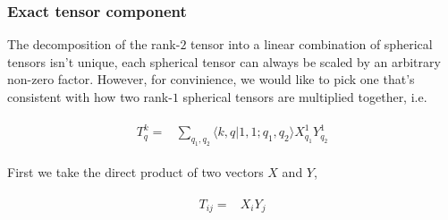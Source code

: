 \documentclass[10pt,fleqn]{article}
\newcommand{\eqar}[1]
{
  \begin{align}
    #1
  \end{align}
}
\begin{document}
\subsubsection{Exact tensor component}
The decomposition of the rank-$2$ tensor into a linear combination of spherical tensors
isn't unique, each spherical tensor can always be scaled by
an arbitrary non-zero factor. However, for convinience, we would like to pick one
that's consistent with how two rank-$1$ spherical tensors are multiplied together,
i.e.
\eqar{
  \begin{split}
    T^k_q=&\sum_{q_1,q_2}\langle k,q|1,1;q_1,q_2\rangle X^1_{q_1}Y^1_{q_2}
  \end{split}
}

First we take the direct product of two vectors $X$ and $Y$,
\eqar{
  \begin{split}
    T_{ij}=&X_iY_j
  \end{split}
}
\end{document}
